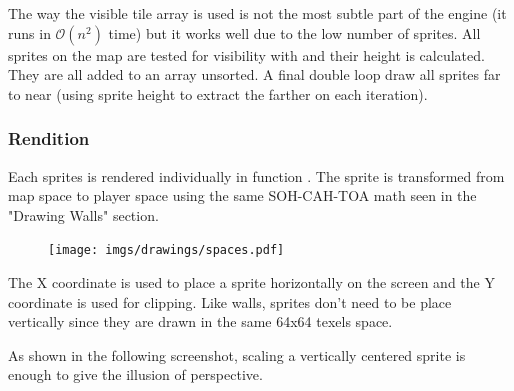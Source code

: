 The way the visible tile array is used is not the most subtle part of the engine (it runs in $\mathcal{O}(n^2)$ time) but it works well due to the low number of sprites. All sprites on the map are tested for visibility with  and their height is calculated. They are all added to an array unsorted. A final double loop draw all sprites far to near (using sprite height to extract the farther on each iteration).\\
\par
\begin{minipage}{\textwidth}
 
 \end{minipage}
 \par
 




\subsubsection{Rendition}
Each sprites is rendered individually in function . The sprite is transformed from map space to player space using the same SOH-CAH-TOA math seen in the "Drawing Walls" section.

\par
\begin{figure}[H]
\centering
 \texttt{[image: imgs/drawings/spaces.pdf]}
 \end{figure}
\par
The X coordinate is used to place a sprite horizontally on the screen and the Y coordinate is used for clipping. Like walls, sprites don't need to be place vertically since they are drawn in the same 64x64 texels space.\\
\par
  \begin{minipage}{.5\textwidth}
  \end{minipage}
   \begin{minipage}{.5\textwidth} 
   \end{minipage}

\par



 As shown in the following screenshot, scaling a vertically centered sprite is enough to give the illusion of perspective.\\
\par
\begin{figure}[H]
 \centering
\end{figure}

